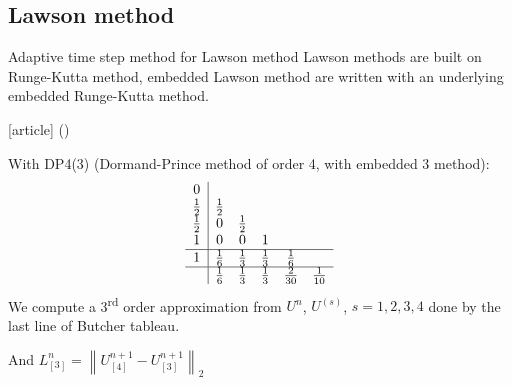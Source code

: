 \documentclass{beamer}
\newcommand{\customcite}[1]{\citeauthor{#1} (\citeyear{#1})}
\begin{document}
\subsection{Lawson method}
\begin{frame}{Adaptive time step method for Lawson method}
  Lawson methods are built on Runge-Kutta method, embedded Lawson method are written with an underlying embedded Runge-Kutta method.

  \begin{thebibliography}{9}
    [article]
     \customcite{Dormand:1978}
  \end{thebibliography}
  With DP4(3) (Dormand-Prince method of order 4, with embedded 3 method):
  $$
    \begin{array}{c|ccccc}
      0           & \\
      \frac{1}{2} & \frac{1}{2} \\
      \frac{1}{2} & 0           & \frac{1}{2} \\
      1           & 0           & 0           & 1           \\
    \hline
      1           & \frac{1}{6} & \frac{1}{3} & \frac{1}{3} & \frac{1}{6} \\
    \hline
                  & \frac{1}{6} & \frac{1}{3} & \frac{1}{3} & \frac{2}{30} & \frac{1}{10}
    \end{array}
  $$
  We compute a 3\textsuperscript{rd} order approximation from $U^n$, $U^{(s)}$, $s=1,2,3,4$ done by the last line of Butcher tableau.

  And $L^{n}_{[3]} = \left\| U^{n+1}_{[4]} - U^{n+1}_{[3]} \right\|_2$
\end{frame}
\end{document}
